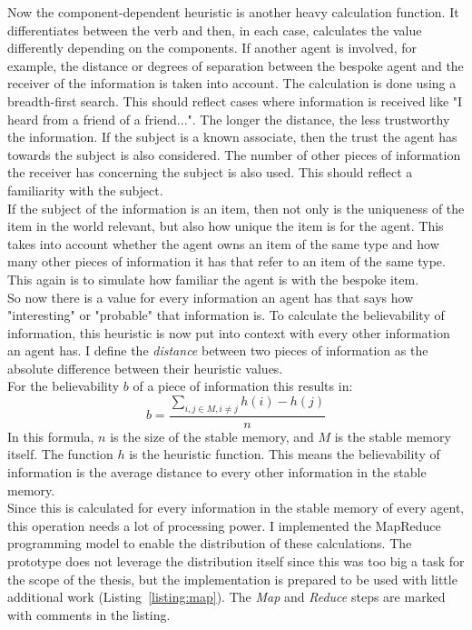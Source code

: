 Now the component-dependent heuristic is another heavy calculation function. It differentiates between the verb and then, in each case, calculates the value differently depending on the components. If another agent is involved, for example, the distance or degrees of separation between the bespoke agent and the receiver of the information is taken into account. The calculation is done using a breadth-first search. This should reflect cases where information is received like "I heard from a friend of a friend...". The longer the distance, the less trustworthy the information. If the subject is a known associate, then the trust the agent has towards the subject is also considered. The number of other pieces of information the receiver has concerning the subject is also used. This should reflect a familiarity with the subject.\\
If the subject of the information is an item, then not only is the uniqueness of the item in the world relevant, but also how unique the item is for the agent. This takes into account whether the agent owns an item of the same type and how many other pieces of information it has that refer to an item of the same type. This again is to simulate how familiar the agent is with the bespoke item.\\
So now there is a value for every information an agent has that says how "interesting" or "probable" that information is. To calculate the believability of information, this heuristic is now put into context with every other information an agent has. I define the \textit{distance} between two pieces of information as the absolute difference between their heuristic values.\\
For the believability $b$ of a piece of information this results in:
\begin{equation}
	b = \frac{\sum_{i,j \in M, i \neq j} h(i)-h(j)}{n}
\end{equation}
In this formula, $n$ is the size of the stable memory, and $M$ is the stable memory itself. The function $h$ is the heuristic function. This means the believability of information is the average distance to every other information in the stable memory.\\
Since this is calculated for every information in the stable memory of every agent, this operation needs a lot of processing power. I implemented the MapReduce programming model to enable the distribution of these calculations. The prototype does not leverage the distribution itself since this was too big a task for the scope of the thesis, but the implementation is prepared to be used with little additional work (Listing~\ref{listing:map}). The \textit{Map} and \textit{Reduce} steps are marked with comments in the listing.
